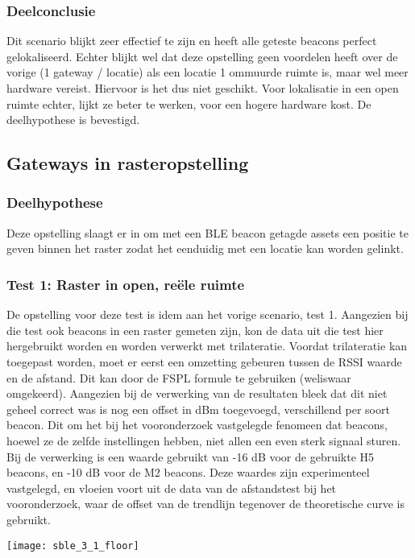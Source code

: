 \subsubsection{Deelconclusie}
Dit scenario blijkt zeer effectief te zijn en heeft alle geteste beacons perfect gelokaliseerd. Echter blijkt wel dat deze opstelling geen voordelen heeft over de vorige (1 gateway / locatie) als een locatie 1 ommuurde ruimte is, maar wel meer hardware vereist. Hiervoor is het dus niet geschikt. Voor lokalisatie in een open ruimte echter, lijkt ze beter te werken, voor een hogere hardware kost. De deelhypothese is bevestigd.

\subsection{Gateways in rasteropstelling}
\subsubsection{Deelhypothese}
Deze opstelling slaagt er in om met een BLE beacon getagde assets een positie te geven binnen het raster zodat het eenduidig met een locatie kan worden gelinkt.

\subsubsection{Test 1: Raster in open, reële ruimte}
\begin{minipage}{0.55\textwidth}
De opstelling voor deze test is idem aan het vorige scenario, test 1. Aangezien bij die test ook beacons in een raster gemeten zijn, kon de data uit die test hier hergebruikt worden en worden verwerkt met trilateratie. Voordat trilateratie kan toegepast worden, moet er eerst een omzetting gebeuren tussen de RSSI waarde en de afstand. Dit kan door de FSPL formule te gebruiken (weliswaar omgekeerd). Aangezien bij de verwerking van de resultaten bleek dat dit niet geheel correct was is nog een offset in dBm toegevoegd, verschillend per soort beacon. Dit om het bij het vooronderzoek vastgelegde fenomeen dat beacons, hoewel ze de zelfde instellingen hebben, niet allen een even sterk signaal sturen. Bij de verwerking is een waarde gebruikt van -16 dB voor de gebruikte H5 beacons, en -10 dB voor de M2 beacons. Deze waardes zijn experimenteel vastgelegd, en vloeien voort uit de data van de afstandstest bij het vooronderzoek, waar de offset van de trendlijn tegenover de theoretische curve is gebruikt.
\end{minipage}
\hfill
\begin{minipage}{0.42\textwidth}
	\texttt{[image: sble\_3\_1\_floor]}
\end{minipage}

